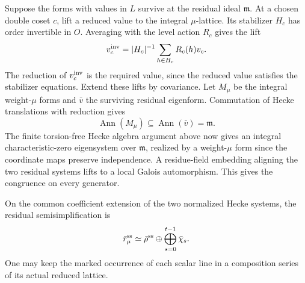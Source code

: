 Suppose the forms with values in \(L\) survive at the residual
ideal \(\mathfrak m\). At a chosen double coset \(c\), lift a
reduced value to the integral \(\mu\)-lattice. Its stabilizer
\(H_c\) has order invertible in \(O\). Averaging with the
level action \(R_c\) gives the lift
\[
        v_c^{\rm inv}=|H_c|^{-1}\sum_{h\in H_c} R_c(h)v_c .
\]
The reduction of \(v_c^{\rm inv}\) is the required value, since
the reduced value satisfies the stabilizer equations. Extend these
lifts by covariance. Let \(M_\mu\) be the integral weight-\(\mu\) forms and \(\bar v\) the surviving residual eigenform. Commutation of Hecke translations with reduction gives
\[
 \operatorname{Ann}(M_\mu)\subseteq\operatorname{Ann}(\bar v)=\mathfrak m.
\]
The finite torsion-free Hecke algebra argument
above now gives an integral characteristic-zero eigensystem
over \(\mathfrak m\), realized by a weight-\(\mu\) form since the
coordinate maps preserve independence. A residue-field embedding
aligning the two residual systems lifts to a local Galois
automorphism. This gives the congruence on every generator.
\label{cor:lift-crystalline-depth-3}



\begin{lemma}
\label{lem:companion-residual-factors}
On the common coefficient extension of the two normalized
Hecke systems, the residual semisimplification is
\[
 \bar r_\mu^{\rm ss}\simeq \bar\rho^{\rm ss}\oplus\bigoplus_{s=0}^{t-1}\bar\chi_s.
\]
One may keep the marked occurrence of each scalar line in a
composition series of its actual reduced lattice.
\end{lemma}

